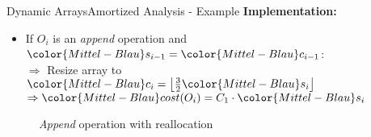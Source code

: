 \begin{frame}{Dynamic Arrays}{Amortized Analysis - Example}
  \textbf{Implementation:}
  \begin{itemize}
    \item
      If {\color{Mittel-Blau}$O_i$} is an \textit{append} operation and
      ${\color{Mittel-Blau}s_{i-1}} = {\color{Mittel-Blau}c_{i-1}}$:\\
      $\Rightarrow$ Resize array to
      ${\color{Mittel-Blau}c_i}
        = \left\lfloor\frac{3}{2} {\color{Mittel-Blau}s_i} \right\rfloor$\\
      $\Rightarrow {\color{Mittel-Blau}cost(O_i)}
        = C_1 \cdot {\color{Mittel-Blau}s_i}$
  \end{itemize}
  \begin{figure}[!h]
    \def\FSAsize{7}\def\FSAelements{7}%
    \def\FSAcopy{0}\def\FSAdelete{0}\def\FSAinsert{0}%
    \def\FSAcopyarrow{0}%
    \def\FSAlabelsize{${\color{Mittel-Blau}s_{i-1}} = 7$}%
    \def\FSAlabelcapacity{%
      ${\color{Mittel-Blau}c_{i-1}}%
        = {\color{Mittel-Blau}s_{i-1}} = 7$}%
    \hspace*{0.5em}\raisebox{2em}{$\Rightarrow$}\hspace*{0.5em}%
    \def\FSAsize{13}\def\FSAelements{0}%
    \def\FSAcopy{8}\def\FSAdelete{0}\def\FSAinsert{1}%
    \def\FSAlabelsize{${\color{Mittel-Blau}s_i}
      = {\color{Mittel-Blau}s_{i-1}} + 1$}%
    \def\FSAlabelcapacity{${\color{Mittel-Blau}c_i}
      = \frac{3}{2}{\color{Mittel-Blau}s_i}$ = 13}%
    \caption{\textit{Append} operation with reallocation}
    \label{fig:dynamic_fields:amortized_analysis:append}
  \end{figure}
\end{frame}


